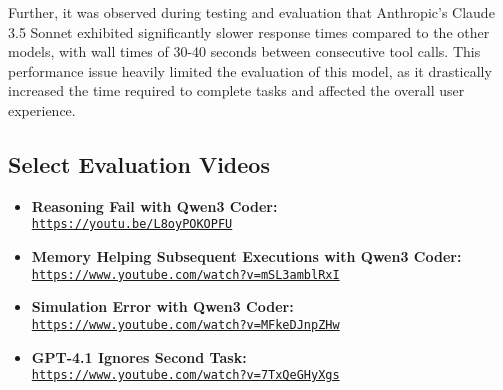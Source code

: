\documentclass[../report.tex]{subfiles}
\begin{document}
Further, it was observed during testing and evaluation that Anthropic's Claude 3.5 Sonnet exhibited significantly slower response times compared to the other models, with wall times of 30-40 seconds between consecutive tool calls. This performance issue heavily limited the evaluation of this model, as it drastically increased the time required to complete tasks and affected the overall user experience.

\subsection{Select Evaluation Videos}
\begin{itemize}
	\item \textbf{Reasoning Fail with Qwen3 Coder:} \\ \href{https://youtu.be/L8oyPOKOPFU}{\nolinkurl{https://youtu.be/L8oyPOKOPFU}}
	\item \textbf{Memory Helping Subsequent Executions with Qwen3 Coder:} \\ \href{https://www.youtube.com/watch?v=mSL3amblRxI}{\nolinkurl{https://www.youtube.com/watch?v=mSL3amblRxI}}
	\item \textbf{Simulation Error with Qwen3 Coder:} \\ \href{https://www.youtube.com/watch?v=MFkeDJnpZHw}{\nolinkurl{https://www.youtube.com/watch?v=MFkeDJnpZHw}}
	\item \textbf{GPT-4.1 Ignores Second Task:} \\ \href{https://www.youtube.com/watch?v=7TxQeGHyXgs}{\nolinkurl{https://www.youtube.com/watch?v=7TxQeGHyXgs}}
\end{itemize}
\end{document}
